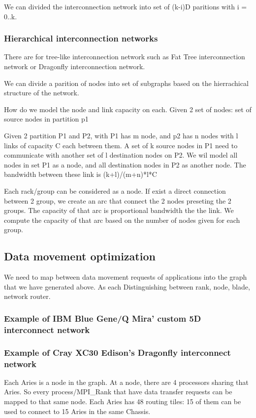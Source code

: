 \documentclass[letter]{article}
\begin{document}
We can divided the interconnection network into set of (k-i)D paritions with i = 0..k.

\subsubsection{Hierarchical interconnection networks}
There are for tree-like interconnection network such as Fat Tree interconnection network or Dragonfly interconnection network. 

We can divide a parition of nodes into set of subgraphs based on the hierrachical structure of the network.

How do we model the node and link capacity on each. Given 2 set of nodes: set of source nodes in partition p1

Given 2 partition P1 and P2, with P1 has m node, and p2 has n nodes with l links of capacity C each between them. A set of k source nodes in P1 need to communicate with another set of l destination nodes on P2. We wil model all nodes in set P1 as a node, and all destination nodes in P2 as another node. The bandwidth between these link is (k+l)/(m+n)*l*C

Each rack/group can be considered as a node. If exist a direct connection between 2 group, we create an arc that connect the 2 nodes preseting the 2 groups. The capacity of that arc is proportional bandwidth the the link. We compute the capacity of that arc based on the number of nodes given for each group.

\subsection{Data movement optimization}
We need to map between data movement requests of applications into the graph that we have generated above. As each 
Distinguishing between rank, node, blade, network router.

\subsubsection{Example of IBM Blue Gene/Q Mira' custom 5D interconnect network}

\subsubsection{Example of Cray XC30 Edison's Dragonfly interconnect network}

Each Aries is a node in the graph. At a node, there are 4 processors sharing that Aries. So every process/MPI\_Rank that have data transfer requests can be mapped to that same node. Each Aries has 48 routing tiles: 15 of them can be used to connect to 15 Aries in the same Chassis. 
\end{document}
